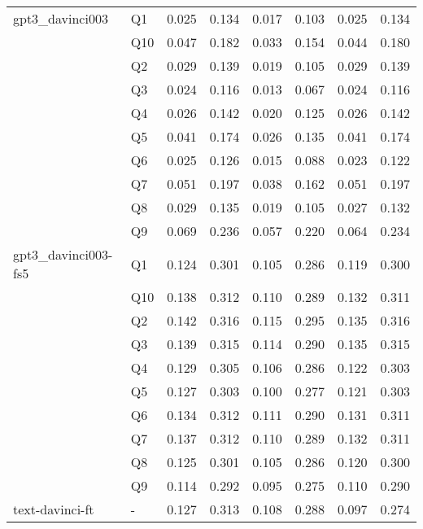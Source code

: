 \begin{tabular}{llrrrrrr}
gpt3\_davinci003 & Q1 & 0.025 & 0.134 & 0.017 & 0.103 & 0.025 & 0.134 \\
                & Q10 & 0.047 & 0.182 & 0.033 & 0.154 & 0.044 & 0.180 \\
                & Q2 & 0.029 & 0.139 & 0.019 & 0.105 & 0.029 & 0.139 \\
                & Q3 & 0.024 & 0.116 & 0.013 & 0.067 & 0.024 & 0.116 \\
                & Q4 & 0.026 & 0.142 & 0.020 & 0.125 & 0.026 & 0.142 \\
                & Q5 & 0.041 & 0.174 & 0.026 & 0.135 & 0.041 & 0.174 \\
                & Q6 & 0.025 & 0.126 & 0.015 & 0.088 & 0.023 & 0.122 \\
                & Q7 & 0.051 & 0.197 & 0.038 & 0.162 & 0.051 & 0.197 \\
                & Q8 & 0.029 & 0.135 & 0.019 & 0.105 & 0.027 & 0.132 \\
                & Q9 & 0.069 & 0.236 & 0.057 & 0.220 & 0.064 & 0.234 \\
gpt3\_davinci003-fs5 & Q1 & 0.124 & 0.301 & 0.105 & 0.286 & 0.119 & 0.300 \\
                & Q10 & 0.138 & 0.312 & 0.110 & 0.289 & 0.132 & 0.311 \\
                & Q2 & 0.142 & 0.316 & 0.115 & 0.295 & 0.135 & 0.316 \\
                & Q3 & 0.139 & 0.315 & 0.114 & 0.290 & 0.135 & 0.315 \\
                & Q4 & 0.129 & 0.305 & 0.106 & 0.286 & 0.122 & 0.303 \\
                & Q5 & 0.127 & 0.303 & 0.100 & 0.277 & 0.121 & 0.303 \\
                & Q6 & 0.134 & 0.312 & 0.111 & 0.290 & 0.131 & 0.311 \\
                & Q7 & 0.137 & 0.312 & 0.110 & 0.289 & 0.132 & 0.311 \\
                & Q8 & 0.125 & 0.301 & 0.105 & 0.286 & 0.120 & 0.300 \\
                & Q9 & 0.114 & 0.292 & 0.095 & 0.275 & 0.110 & 0.290 \\
text-davinci-ft & - & 0.127 & 0.313 & 0.108 & 0.288 & 0.097 & 0.274 \\
\bottomrule
\end{tabular}

